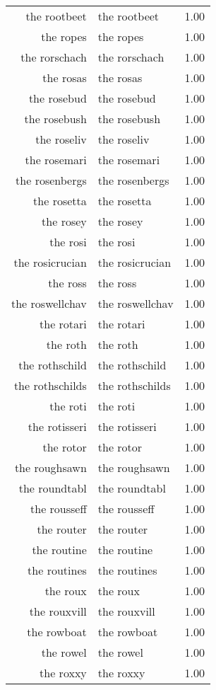 \begin{table}[ht]
\begin{tabular}{rlr}
  the rootbeet & the rootbeet & 1.00 \\ 
  the ropes & the ropes & 1.00 \\ 
  the rorschach & the rorschach & 1.00 \\ 
  the rosas & the rosas & 1.00 \\ 
  the rosebud & the rosebud & 1.00 \\ 
  the rosebush & the rosebush & 1.00 \\ 
  the roseliv & the roseliv & 1.00 \\ 
  the rosemari & the rosemari & 1.00 \\ 
  the rosenbergs & the rosenbergs & 1.00 \\ 
  the rosetta & the rosetta & 1.00 \\ 
  the rosey & the rosey & 1.00 \\ 
  the rosi & the rosi & 1.00 \\ 
  the rosicrucian & the rosicrucian & 1.00 \\ 
  the ross & the ross & 1.00 \\ 
  the roswellchav & the roswellchav & 1.00 \\ 
  the rotari & the rotari & 1.00 \\ 
  the roth & the roth & 1.00 \\ 
  the rothschild & the rothschild & 1.00 \\ 
  the rothschilds & the rothschilds & 1.00 \\ 
  the roti & the roti & 1.00 \\ 
  the rotisseri & the rotisseri & 1.00 \\ 
  the rotor & the rotor & 1.00 \\ 
  the roughsawn & the roughsawn & 1.00 \\ 
  the roundtabl & the roundtabl & 1.00 \\ 
  the rousseff & the rousseff & 1.00 \\ 
  the router & the router & 1.00 \\ 
  the routine & the routine & 1.00 \\ 
  the routines & the routines & 1.00 \\ 
  the roux & the roux & 1.00 \\ 
  the rouxvill & the rouxvill & 1.00 \\ 
  the rowboat & the rowboat & 1.00 \\ 
  the rowel & the rowel & 1.00 \\ 
  the roxxy & the roxxy & 1.00 \\ 

\end{tabular}
\end{table}
